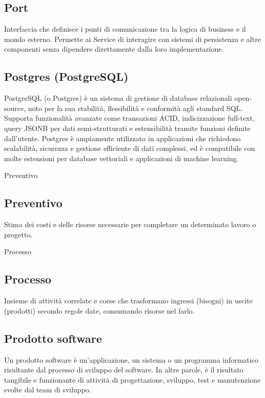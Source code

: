 \hypertarget{sec:port}{}
\subsection*{Port}
Interfaccia che definisce i punti di comunicazione tra la logica di business e il mondo esterno. Permette ai Service di interagire con sistemi di persistenza e altre componenti senza dipendere direttamente dalla loro implementazione.

\hypertarget{sec:postgres}{}
\subsection*{Postgres (PostgreSQL)}
PostgreSQL (o Postgres) è un sistema di gestione di database relazionali open-source, noto per la sua stabilità, flessibilità e conformità agli standard SQL. 
Supporta funzionalità avanzate come transazioni ACID, indicizzazione full-text, query JSONB per dati semi-strutturati e estensibilità tramite funzioni 
definite dall'utente. Postgres è ampiamente utilizzato in applicazioni che richiedono scalabilità, sicurezza e gestione efficiente di dati complessi, ed è 
compatibile con molte estensioni per database vettoriali e applicazioni di machine learning.

\hypertarget{sec:preventivo}{Preventivo}
\subsection*{Preventivo}
Stima dei costi e delle risorse necessarie per completare un determinato lavoro o progetto.

\hypertarget{sec:processo}{Processo}
\subsection*{Processo}
Insieme di attività correlate e coese che trasformano ingressi (bisogni) in uscite (prodotti) secondo regole date,
consumando risorse nel farlo.

\hypertarget{sec:prodotto_software}{}
\subsection*{Prodotto software}
Un prodotto software è un’applicazione, un sistema o un programma
informatico risultante dal processo di sviluppo del software. In altre parole, è il risultato
tangibile e funzionante di attività di progettazione, sviluppo, test e manutenzione svolte dal
team di sviluppo.

